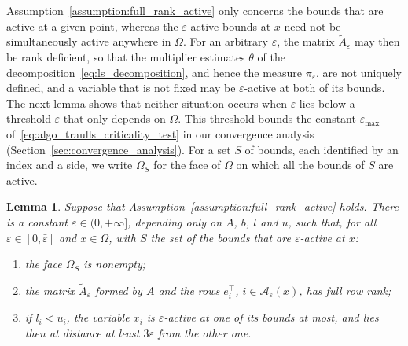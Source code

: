 \documentclass{article}
\numberwithin{equation}{section}
\newcommand{\calA}{{\mathcal{A}}}
\theoremstyle{plain}
\newtheorem{lemma}[theorem]{Lemma}
\begin{document}
Assumption~\ref{assumption:full_rank_active} only concerns the bounds that are active at a given point, whereas the $\varepsilon$-active bounds at $x$ need not be simultaneously active anywhere in $\Omega$. For an arbitrary $\varepsilon$, the matrix $\tilde{A}_\varepsilon$ may then be rank deficient, so that the multiplier estimates $\theta$ of the decomposition~\eqref{eq:ls_decomposition}, and hence the measure $\pi_\varepsilon$, are not uniquely defined, and a variable that is not fixed may be $\varepsilon$-active at both of its bounds. The next lemma shows that neither situation occurs when $\varepsilon$ lies below a threshold $\bar\varepsilon$ that only depends on $\Omega$. This threshold bounds the constant $\varepsilon_{\max}$ of~\eqref{eq:algo_traulls_criticality_test} in our convergence analysis (Section~\ref{sec:convergence_analysis}). For a set $S$ of bounds, each identified by an index and a side, we write $\Omega_S$ for the face of $\Omega$ on which all the bounds of $S$ are active.
\begin{lemma}\label{lemma:eps_threshold}
	Suppose that Assumption~\ref{assumption:full_rank_active} holds. There is a constant $\bar\varepsilon \in (0,+\infty]$, depending only on $A$, $b$, $l$ and $u$, such that, for all $\varepsilon \in [0,\bar\varepsilon]$ and $x \in \Omega$, with $S$ the set of the bounds that are $\varepsilon$-active at $x$:
	\begin{enumerate}[label=(\roman*), leftmargin=*, itemsep=2pt]
		\item the face $\Omega_S$ is nonempty;
		\item the matrix $\tilde{A}_\varepsilon$ formed by $A$ and the rows $e_i^\top$, $i \in \calA_\varepsilon(x)$, has full row rank;
		\item if $l_i < u_i$, the variable $x_i$ is $\varepsilon$-active at one of its bounds at most, and lies then at distance at least $3\varepsilon$ from the other one.
	\end{enumerate}
\end{lemma}
\end{document}
